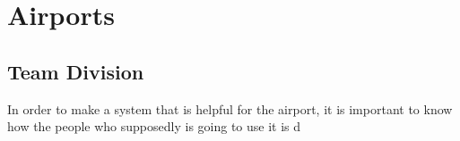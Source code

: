 \chapter{Airports}
\section{Team Division}
In order to make a system that is helpful for the airport, it is important to know how the people who supposedly is going to use it is d






